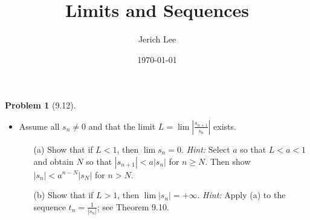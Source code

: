 \documentclass[12pt]{article}
\title{Limits and Sequences}
\author{Jerich Lee}
\date{\today}
\theoremstyle{definition} %
\newtheorem{problem}{Problem}
\theoremstyle{plain} %
\begin{document}
\maketitle

\begin{problem}[9.12]
    \begin{itemize}
        \item Assume all $s_n \neq 0$ and that the limit $L = \lim \left| \frac{s_{n+1}}{s_n} \right|$ exists.
        \begin{enumerate}
            \item[(a)] Show that if $L < 1$, then $\lim s_n = 0$. \emph{Hint:} Select $a$ so that $L < a < 1$ and obtain $N$ so that $|s_{n+1}| < a|s_n|$ for $n \ge N$. Then show $|s_n| < a^{n-N}|s_N|$ for $n > N$.
            \item[(b)] Show that if $L > 1$, then $\lim |s_n| = +\infty$. \emph{Hint:} Apply (a) to the sequence $t_n = \frac{1}{|s_n|}$; see Theorem 9.10.
        \end{enumerate}
    \end{itemize}
\end{problem}
\end{document}
